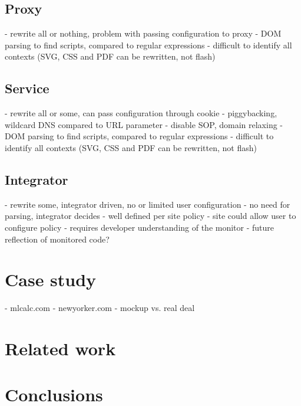 \documentclass{llncs}
\begin{document}
\subsection{Proxy}

- rewrite all or nothing, problem with passing configuration to proxy
- DOM parsing to find scripts, compared to regular expressions
- difficult to identify all contexts (SVG, CSS and PDF can be rewritten, not flash)

\subsection{Service}

- rewrite all or some, can pass configuration through cookie
- piggybacking, wildcard DNS compared to URL parameter
- disable SOP, domain relaxing
- DOM parsing to find scripts, compared to regular expressions
- difficult to identify all contexts (SVG, CSS and PDF can be rewritten, not flash)

\subsection{Integrator}

- rewrite some, integrator driven, no or limited user configuration
- no need for parsing, integrator decides
- well defined per site policy
- site could allow user to configure policy
- requires developer understanding of the monitor
- future reflection of monitored code?


\section{Case study}
\label{sec:case}

- mlcalc.com
- newyorker.com
- mockup vs. real deal

\section{Related work}
\label{sec:related}

\section{Conclusions}
\label{sec:conc}



\end{document}

